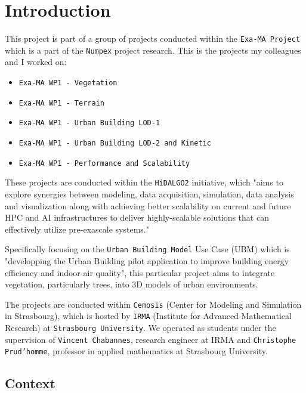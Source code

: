 \documentclass[12pt]{article}
\begin{document}
\tableofcontents

\newpage

\section{Introduction}

This project is part of a group of projects conducted within the \texttt{Exa-MA Project}
\cite{exaMA} which is a part of the \texttt{Numpex} project research\cite{numpex}. 
This is the projects my colleagues and I worked on:
\begin{itemize}
    \item \texttt{Exa-MA WP1 - Vegetation}
    \item \texttt{Exa-MA WP1 - Terrain}
    \item \texttt{Exa-MA WP1 - Urban Building LOD-1}
    \item \texttt{Exa-MA WP1 - Urban Building LOD-2 and Kinetic}
    \item \texttt{Exa-MA WP1 - Performance and Scalability}
\end{itemize}

These projects are conducted within the \texttt{HiDALGO2}\cite{hidalgo2} initiative, which
"aims to explore synergies between modeling, data acquisition, simulation,
data analysis and visualization along with achieving better scalability on
current and future HPC and AI infrastructures to deliver highly-scalable
solutions that can effectively utilize pre-exascale systems."\cite{hidalgo2-about}

Specifically focusing on the \texttt{Urban Building Model}\cite{hidalgo2-ubm}
Use Case (UBM) which is "developping the Urban Building pilot application to
improve building energy efficiency and indoor air quality"\cite{hidalgo2-ubm},
this particular project aims to integrate vegetation, particularly trees, into 3D models
of urban environments.

The projects are conducted within \texttt{Cemosis}\cite{cemosis} (Center for
Modeling and Simulation in Strasbourg), which is hosted by
\texttt{IRMA}\cite{irma} (Institute for Advanced Mathematical Research) at
\texttt{Strasbourg University}. We operated as students under the supervision of
 \texttt{Vincent Chabannes}\cite{chabannes}, research engineer at IRMA and 
 \texttt{Christophe Prud'homme}\cite{prudhomme}, professor in applied mathematics
  at Strasbourg University.

\subsection{Context}
\end{document}
